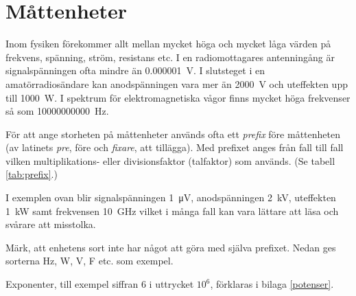 \chapter{Måttenheter}

  Inom fysiken förekommer allt mellan mycket höga och mycket låga
  värden på frekvens, spänning, ström, resistans etc.
  I en radiomottagares antenningång är signalspänningen ofta mindre än
  \SI{0,000001}{\volt}.
  I slutsteget i en amatörradiosändare kan anodspänningen vara mer än
  \SI{2000}{\volt} och uteffekten upp till \SI{1000}{\watt}.
  I spektrum för elektromagnetiska vågor finns mycket höga frekvenser
  så som \SI{10000000000}{\hertz}.

  För att ange storheten på måttenheter används ofta ett \emph{prefix} före
  måttenheten (av latinets \emph{pre}, före och \emph{fixare}, att tillägga).
  Med prefixet anges från fall till fall vilken multiplikations- eller
  divisionsfaktor (talfaktor) som används. (Se tabell \ref{tab:prefix}.)

  I exemplen ovan blir signalspänningen \SI{1}{\micro\volt}, anodspänningen
  \SI{2}{\kilo\volt}, uteffekten \SI{1}{\kilo\watt} samt frekvensen
  \SI{10}{\giga\hertz} vilket i många fall kan vara lättare att läsa och svårare
  att misstolka.

  Märk, att enhetens sort inte har något att göra med själva prefixet.
  Nedan ges sorterna Hz, W, V, F etc. som exempel.

  Exponenter, till exempel siffran 6 i uttrycket \(10^6\), förklaras i
  bilaga \ref{potenser}.

